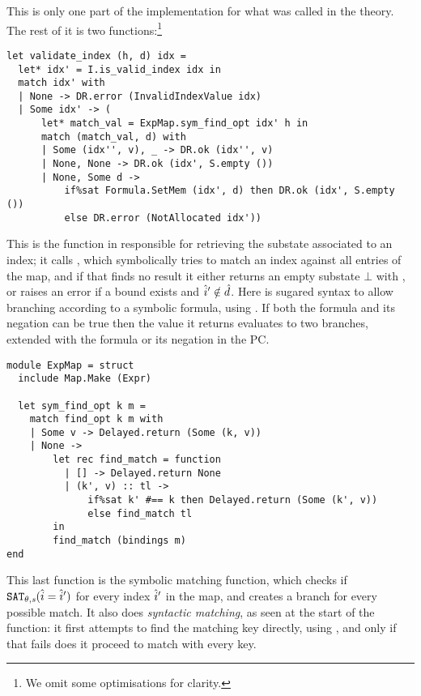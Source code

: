 This is only one part of the implementation for what was called  in the theory. The rest of it is two functions:\footnote{We omit some optimisations for clarity.} \begin{lstlisting}
let validate_index (h, d) idx =
  let* idx' = I.is_valid_index idx in
  match idx' with
  | None -> DR.error (InvalidIndexValue idx)
  | Some idx' -> (
      let* match_val = ExpMap.sym_find_opt idx' h in
      match (match_val, d) with
      | Some (idx'', v), _ -> DR.ok (idx'', v)
      | None, None -> DR.ok (idx', S.empty ())
      | None, Some d ->
          if%sat Formula.SetMem (idx', d) then DR.ok (idx', S.empty ())
          else DR.error (NotAllocated idx'))
\end{lstlisting}
This is the function in \PMap{} responsible for retrieving the substate associated to an index; it calls , which symbolically tries to match an index against all entries of the map, and if that finds no result it either returns an empty substate $\bot$ with , or raises an error if a bound exists and $\hat{i}'\notin \hat{d}$. Here  is sugared syntax to allow branching according to a symbolic formula, using . If both the formula and its negation can be true then the value it returns evaluates to two branches, extended with the formula or its negation in the PC.
\begin{lstlisting}
module ExpMap = struct
  include Map.Make (Expr)

  let sym_find_opt k m =
    match find_opt k m with
    | Some v -> Delayed.return (Some (k, v))
    | None ->
        let rec find_match = function
          | [] -> Delayed.return None
          | (k', v) :: tl ->
              if%sat k' #== k then Delayed.return (Some (k', v))
              else find_match tl
        in
        find_match (bindings m)
end
\end{lstlisting}
This last function is the symbolic matching function, which checks if $\texttt{SAT}_{\mathit{\theta,s}}(\hat{i} = \hat{i}')$ for every index $\hat{i}'$ in the map, and creates a branch for every possible match. It also does \emph{syntactic matching}, as seen at the start of the function: it first attempts to find the matching key directly, using , and only if that fails does it proceed to match with every key.

